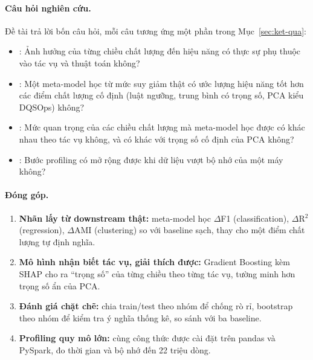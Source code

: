 \paragraph{Câu hỏi nghiên cứu.} Đề tài trả lời bốn câu hỏi, mỗi câu tương ứng một phần trong Mục~\ref{sec:ket-qua}:
\begin{itemize}
  \item {}: Ảnh hưởng của từng chiều chất lượng đến hiệu năng có thực sự phụ thuộc vào tác vụ và thuật toán không?
  \item {}: Một meta-model học từ mức suy giảm thật có ước lượng hiệu năng tốt hơn các điểm chất lượng cố định (luật ngưỡng, trung bình có trọng số, PCA kiểu DQSOps) không?
  \item {}: Mức quan trọng của các chiều chất lượng mà meta-model học được có khác nhau theo tác vụ không, và có khác với trọng số cố định của PCA không?
  \item {}: Bước profiling có mở rộng được khi dữ liệu vượt bộ nhớ của một máy không?
\end{itemize}

\paragraph{Đóng góp.}
\begin{enumerate}
  \item \textbf{Nhãn lấy từ downstream thật:} meta-model học $\Delta$F1 (classification), $\Delta$R$^2$ (regression), $\Delta$AMI (clustering) so với baseline sạch, thay cho một điểm chất lượng tự định nghĩa.
  \item \textbf{Mô hình nhận biết tác vụ, giải thích được:} Gradient Boosting kèm SHAP cho ra ``trọng số'' của từng chiều theo từng tác vụ, tường minh hơn trọng số ẩn của PCA.
  \item \textbf{Đánh giá chặt chẽ:} chia train/test theo nhóm để chống rò rỉ, bootstrap theo nhóm để kiểm tra ý nghĩa thống kê, so sánh với ba baseline.
  \item \textbf{Profiling quy mô lớn:} cùng công thức được cài đặt trên pandas và PySpark, đo thời gian và bộ nhớ đến 22 triệu dòng.
\end{enumerate}
